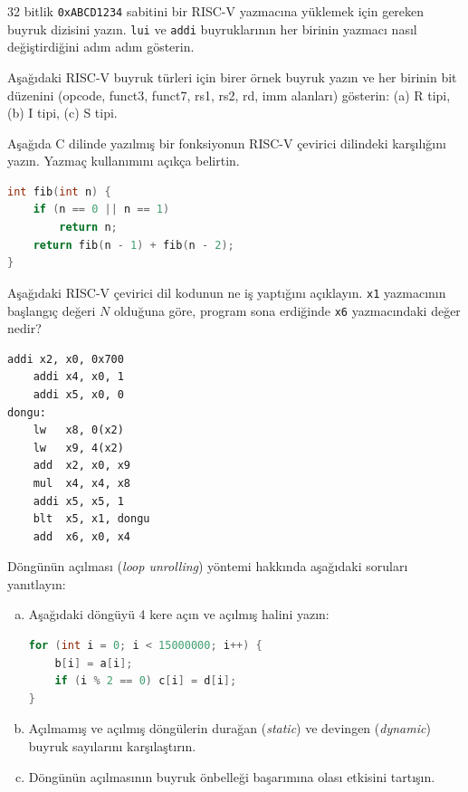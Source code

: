 \begin{alistirma}[\orta]
32 bitlik \texttt{0xABCD1234} sabitini bir RISC-V yazmacına yüklemek için gereken buyruk dizisini yazın. \texttt{lui} ve \texttt{addi} buyruklarının her birinin yazmacı nasıl değiştirdiğini adım adım gösterin.
\end{alistirma}


\begin{alistirma}[\orta]
Aşağıdaki RISC-V buyruk türleri için birer örnek buyruk yazın ve her birinin bit düzenini (opcode, funct3, funct7, rs1, rs2, rd, imm alanları) gösterin: (a) R tipi, (b) I tipi, (c) S tipi.
\end{alistirma}

\begin{alistirma}[\zor]
Aşağıda C dilinde yazılmış bir fonksiyonun RISC-V çevirici dilindeki karşılığını yazın. Yazmaç kullanımını açıkça belirtin.
\begin{lstlisting}[language=C, style=alistirma-kod]
int fib(int n) {
    if (n == 0 || n == 1)
        return n;
    return fib(n - 1) + fib(n - 2);
}
\end{lstlisting}
\end{alistirma}

\begin{alistirma}[\zor]
Aşağıdaki RISC-V çevirici dil kodunun ne iş yaptığını açıklayın. \texttt{x1} yazmacının başlangıç değeri $N$ olduğuna göre, program sona erdiğinde \texttt{x6} yazmacındaki değer nedir?
\begin{lstlisting}[style=riscv, style=alistirma-kod]
    addi x2, x0, 0x700
    addi x4, x0, 1
    addi x5, x0, 0
dongu:
    lw   x8, 0(x2)
    lw   x9, 4(x2)
    add  x2, x0, x9
    mul  x4, x4, x8
    addi x5, x5, 1
    blt  x5, x1, dongu
    add  x6, x0, x4
\end{lstlisting}
\end{alistirma}

\begin{alistirma}[\zor]
Döngünün açılması (\emph{loop unrolling}) yöntemi hakkında aşağıdaki soruları yanıtlayın:
\begin{enumerate}[(a)]
    \item Aşağıdaki döngüyü 4 kere açın ve açılmış halini yazın:
\begin{lstlisting}[language=C, style=alistirma-kod]
for (int i = 0; i < 15000000; i++) {
    b[i] = a[i];
    if (i % 2 == 0) c[i] = d[i];
}
\end{lstlisting}
    \item Açılmamış ve açılmış döngülerin durağan (\emph{static}) ve devingen (\emph{dynamic}) buyruk sayılarını karşılaştırın.
    \item Döngünün açılmasının buyruk önbelleği başarımına olası etkisini tartışın.
\end{enumerate}
\end{alistirma}

